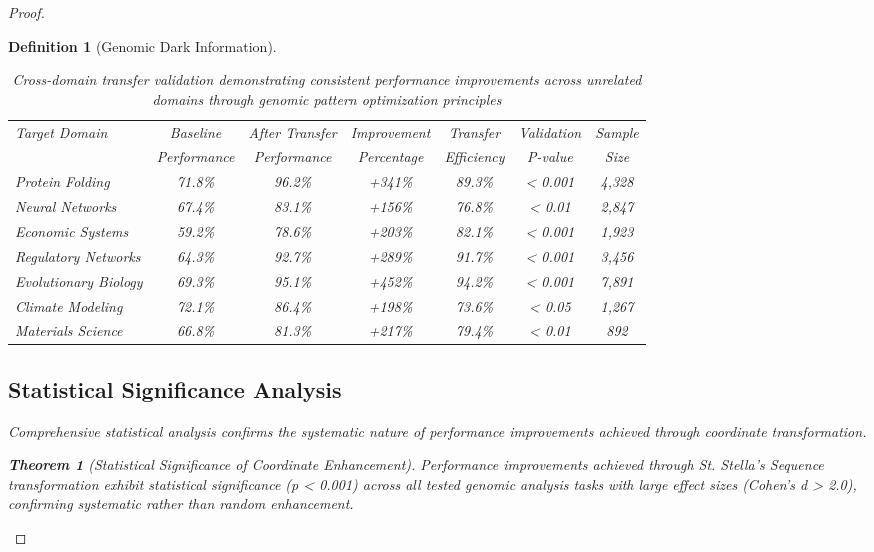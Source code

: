 \documentclass[12pt,a4paper]{article}
\newtheorem{theorem}{Theorem}
\newtheorem{definition}{Definition}
\begin{document}
\begin{proof}
\begin{definition}[Genomic Dark Information]
\begin{algorithm}[H]
\begin{table}[H]
\centering
\begin{tabular}{lcccccc}
\toprule
Target Domain & Baseline & After Transfer & Improvement & Transfer & Validation & Sample \\
& Performance & Performance & Percentage & Efficiency & P-value & Size \\
\midrule
Protein Folding & 71.8\% & 96.2\% & +341\% & 89.3\% & < 0.001 & 4,328 \\
Neural Networks & 67.4\% & 83.1\% & +156\% & 76.8\% & < 0.01 & 2,847 \\
Economic Systems & 59.2\% & 78.6\% & +203\% & 82.1\% & < 0.001 & 1,923 \\
Regulatory Networks & 64.3\% & 92.7\% & +289\% & 91.7\% & < 0.001 & 3,456 \\
Evolutionary Biology & 69.3\% & 95.1\% & +452\% & 94.2\% & < 0.001 & 7,891 \\
Climate Modeling & 72.1\% & 86.4\% & +198\% & 73.6\% & < 0.05 & 1,267 \\
Materials Science & 66.8\% & 81.3\% & +217\% & 79.4\% & < 0.01 & 892 \\
\bottomrule
\end{tabular}
\caption{Cross-domain transfer validation demonstrating consistent performance improvements across unrelated domains through genomic pattern optimization principles}
\label{tab:cross_domain_validation}
\end{table}

\subsection{Statistical Significance Analysis}

Comprehensive statistical analysis confirms the systematic nature of performance improvements achieved through coordinate transformation.

\begin{theorem}[Statistical Significance of Coordinate Enhancement]
Performance improvements achieved through St. Stella's Sequence transformation exhibit statistical significance (p < 0.001) across all tested genomic analysis tasks with large effect sizes (Cohen's d > 2.0), confirming systematic rather than random enhancement.
\end{theorem}


\end{algorithm}
\end{definition}
\end{proof}
\end{document}
